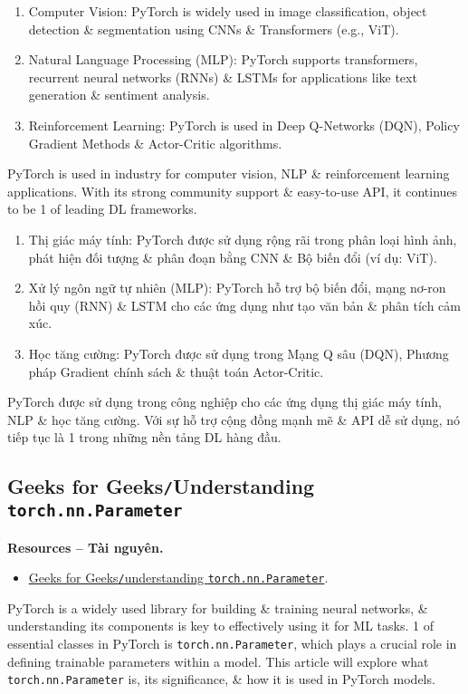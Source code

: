 \documentclass{article}
\begin{document}
\begin{enumerate}
    \item Computer Vision: PyTorch is widely used in image classification, object detection \& segmentation using CNNs \& Transformers (e.g., ViT).
    \item Natural Language Processing (MLP): PyTorch supports transformers, recurrent neural networks (RNNs) \& LSTMs for applications like text generation \& sentiment analysis.
    \item Reinforcement Learning: PyTorch is used in Deep Q-Networks (DQN), Policy Gradient Methods \& Actor-Critic algorithms.
\end{enumerate}
PyTorch is used in industry for computer vision, NLP \& reinforcement learning applications. With its strong community support \& easy-to-use API, it continues to be 1 of leading DL frameworks.
\begin{enumerate}
    \item Thị giác máy tính: PyTorch được sử dụng rộng rãi trong phân loại hình ảnh, phát hiện đối tượng \& phân đoạn bằng CNN \& Bộ biến đổi (ví dụ: ViT).
    \item Xử lý ngôn ngữ tự nhiên (MLP): PyTorch hỗ trợ bộ biến đổi, mạng nơ-ron hồi quy (RNN) \& LSTM cho các ứng dụng như tạo văn bản \& phân tích cảm xúc.
    \item Học tăng cường: PyTorch được sử dụng trong Mạng Q sâu (DQN), Phương pháp Gradient chính sách \& thuật toán Actor-Critic.
\end{enumerate}
PyTorch được sử dụng trong công nghiệp cho các ứng dụng thị giác máy tính, NLP \& học tăng cường. Với sự hỗ trợ cộng đồng mạnh mẽ \& API dễ sử dụng, nó tiếp tục là 1 trong những nền tảng DL hàng đầu.


\subsection{Geeks for Geeks{\tt/}Understanding {\tt torch.nn.Parameter}}
\textbf{\textsf{Resources -- Tài nguyên.}}
\begin{itemize}
    \item \href{https://www.geeksforgeeks.org/deep-learning/understanding-torchnnparameter/}{Geeks for Geeks{\tt/}understanding {\tt torch.nn.Parameter}}.
\end{itemize}
PyTorch is a widely used library for building \& training neural networks, \& understanding its components is key to effectively using it for ML tasks. 1 of essential classes in PyTorch is  {\tt torch.nn.Parameter}, which plays a crucial role in defining trainable parameters within a model. This article will explore what {\tt torch.nn.Parameter} is, its significance, \& how it is used in PyTorch models.
\end{document}
